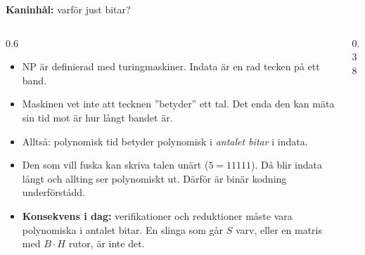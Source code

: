\documentclass[aspectratio=169,10pt]{beamer}
\newcommand{\rabbit}{\textcolor{warnorange}{\textbf{Kaninhål:}} }
\begin{document}
\begin{frame}{\rabbit varför just bitar?}
  \begin{columns}[T]
    \begin{column}{0.6\textwidth}
      \begin{itemize}
        \item<1-> NP är definierad med turingmaskiner. Indata är en rad tecken på ett band.
        \item<2-> Maskinen vet inte att tecknen ''betyder'' ett tal. Det enda den kan mäta sin tid mot är hur långt bandet är.
        \item<3-> Alltså: polynomisk tid betyder polynomisk i \emph{antalet bitar} i indata.
        \item<4-> Den som vill fuska kan skriva talen unärt ($5 = 11111$). Då blir indata långt och allting ser polynomiskt ut. Därför är binär kodning underförstådd.
        \item<5-> \textbf{Konsekvens i dag:} verifikationer och reduktioner måste vara polynomiska i antalet bitar. En slinga som går $S$ varv, eller en matris med $B\cdot H$ rutor, är inte det.
      \end{itemize}
    \end{column}
    \begin{column}{0.38\textwidth}
      \centering
    \end{column}
  \end{columns}
\end{frame}
\end{document}
